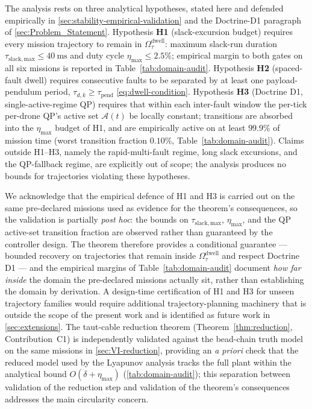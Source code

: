 The analysis rests on three analytical hypotheses, stated here and defended empirically in \cref{sec:stability-empirical-validation} and the Doctrine-D1 paragraph of \cref{sec:Problem_Statement}. Hypothesis \textbf{H1} (slack-excursion budget) requires every mission trajectory to remain in $\Omega_\tau^{\mathrm{dwell}}$: maximum slack-run duration $\tau_{\mathrm{slack,max}} \le \SI{40}{\milli\second}$ and duty cycle $\eta_{\max} \le 2.5\%$; empirical margin to both gates on all six missions is reported in Table~\ref{tab:domain-audit}. Hypothesis \textbf{H2} (spaced-fault dwell) requires consecutive faults to be separated by at least one payload-pendulum period, $\tau_{d,k} \ge \tau_{\mathrm{pend}}$ \eqref{eq:dwell-condition}. Hypothesis \textbf{H3} (Doctrine D1, single-active-regime QP) requires that within each inter-fault window the per-tick per-drone QP's active set $\mathcal{A}(t)$ be locally constant; transitions are absorbed into the $\eta_{\max}$ budget of H1, and are empirically active on at least $99.9\%$ of mission time (worst transition fraction $0.10\%$, Table~\ref{tab:domain-audit}). Claims outside H1--H3, namely the rapid-multi-fault regime, long slack excursions, and the QP-fallback regime, are explicitly out of scope; the analysis produces no bounds for trajectories violating these hypotheses.

We acknowledge that the empirical defence of H1 and H3 is carried out on the same pre-declared missions used as evidence for the theorem's consequences, so the validation is partially \emph{post hoc}: the bounds on $\tau_{\mathrm{slack,max}}$, $\eta_{\max}$, and the QP active-set transition fraction are observed rather than guaranteed by the controller design. The theorem therefore provides a conditional guarantee --- bounded recovery on trajectories that remain inside $\Omega_\tau^{\mathrm{dwell}}$ and respect Doctrine D1 --- and the empirical margins of Table~\ref{tab:domain-audit} document \emph{how far inside} the domain the pre-declared missions actually sit, rather than establishing the domain by derivation. A design-time certification of H1 and H3 for unseen trajectory families would require additional trajectory-planning machinery that is outside the scope of the present work and is identified as future work in \cref{sec:extensions}. The taut-cable reduction theorem (Theorem~\ref{thm:reduction}, Contribution~C1) is independently validated against the bead-chain truth model on the same missions in \cref{sec:VI-reduction}, providing an \emph{a priori} check that the reduced model used by the Lyapunov analysis tracks the full plant within the analytical bound $O(\delta + \eta_{\max})$ (\cref{tab:domain-audit}); this separation between validation of the reduction step and validation of the theorem's consequences addresses the main circularity concern.

